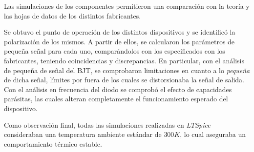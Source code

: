 \documentclass[../main.tex]{subfiles}
\begin{document}
Las simulaciones de los componentes permitieron una comparación con la teoría y las hojas de datos de los distintos fabricantes.

Se obtuvo el punto de operación de los distintos dispositivos y se identificó la polarización de los mismos. A partir de ellos, se calcularon los parámetros de pequeña señal para cada uno, comparándolos con los especificados con los fabricantes, teniendo coincidencias y discrepancias. En particular, con el análisis de pequeña de señal del BJT, se comprobaron limitaciones en cuanto a lo \emph{pequeña} de dicha señal, límites por fuera de los cuales se distorsionaba la señal de salida. Con el análisis en frecuencia del diodo se comprobó el efecto de capacidades parásitas, las cuales alteran completamente el funcionamiento esperado del dispositivo.

Como observación final, todas las simulaciones realizadas en \emph{LTSpice} consideraban una temperatura ambiente estándar de $300K$, lo cual aseguraba un comportamiento térmico estable.
\end{document}
